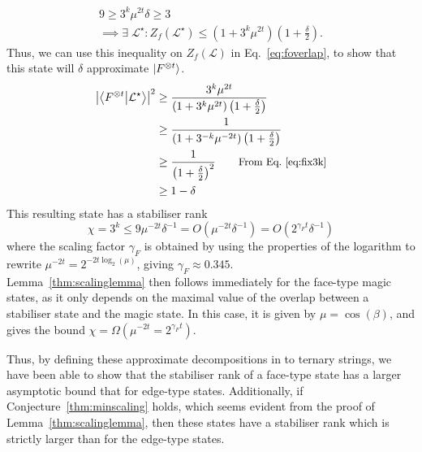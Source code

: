 \documentclass{standalone}
\begin{document}
\begin{align}
\label{eq:fix3k}
9\geq 3^{k}\mu^{2t}\delta\geq 3\\
\label{eq:Zfbound}
\implies\exists\;\mathcal{L}^{\star} : Z_{f}\left(\mathcal{L}^{\star}\right)\leq \left(1+3^{k}\mu^{2t}\right)\left(1+\frac{\delta}{2}\right).
\end{align}
Thus, we can use this inequality on $Z_{f}(\mathcal{L})$ in Eq.~\ref{eq:foverlap}, to show that this state will $\delta$ approximate $\ket{F^{\otimes t}}$.
\begin{align}
\begin{split}
    \left| \braket{F^{\otimes t}}{\mathcal{L}^{\star}}\right|^{2} &\geq
    \frac{3^{k}\mu^{2t}}{\left(1+3^{k}\mu^{2t}\right)\left(1+\frac{\delta}{2}\right)}  \\
    &\geq \frac{1}{\left(1+3^{-k}\mu^{-2t}\right)\left(1+\frac{\delta}{2}\right)}\\
    &\geq \frac{1}{\left(1+\frac{\delta}{2}\right)^{2}} \qquad \text{\small{From Eq.~\ref{eq:fix3k}}}\\
    &\geq 1-\delta \\
\end{split}
\end{align}
This resulting state has a stabiliser rank 
\begin{equation}
\chi=3^{k}\leq 9\mu^{-2t}\delta^{-1} = O\left(\mu^{-2t}\delta^{-1}\right)=O\left(2^{\gamma_{F}t}\delta^{-1}\right)
\end{equation}
where the scaling factor $\gamma_{F}$ is obtained by using the properties of the logarithm to rewrite $\mu^{-2t}=2^{-2t\log_{2}(\mu)}$, giving $\gamma_{F}\approx0.345$.\\
Lemma~\ref{thm:scalinglemma} then follows immediately for the face-type magic states, as it only depends on the maximal value of the overlap between a stabiliser state and the magic state. In this case, it is given by $\mu=\cos(\beta)$, and gives the bound $\chi=\Omega\left(\mu^{-2t}=2^{\gamma_{F}t}\right)$.
\par
Thus, by defining these approximate decompositions in to ternary strings, we have been able to show that the stabiliser rank of a face-type state has a larger asymptotic bound that for edge-type states. Additionally, if Conjecture~\ref{thm:minscaling} holds, which seems evident from the proof of Lemma~\ref{thm:scalinglemma}, then these states have a stabiliser rank which is strictly larger than for the edge-type states.
\end{document}
